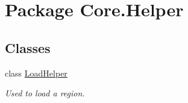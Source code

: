 \hypertarget{namespaceCore_1_1Helper}{\section{Package Core.\-Helper}
\label{namespaceCore_1_1Helper}
}
\subsection*{Classes}
\begin{DoxyCompactItemize}
\item 
class \hyperlink{classCore_1_1Helper_1_1LoadHelper}{Load\-Helper}
\begin{DoxyCompactList}\small\item\em Used to load a region. \end{DoxyCompactList}\end{DoxyCompactItemize}
